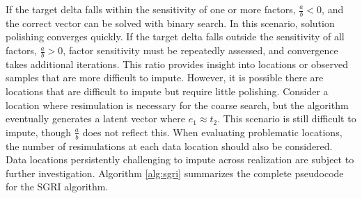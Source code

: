 If the target delta falls within the sensitivity of one or more factors, $\frac{a}{b}<0$, and the correct vector can be solved with binary search. In this scenario, solution polishing converges quickly. If the target delta falls outside the sensitivity of all factors, $\frac{a}{b}>0$, factor sensitivity must be repeatedly assessed, and convergence takes additional iterations. This ratio provides insight into locations or observed samples that are more difficult to impute. However, it is possible there are locations that are difficult to impute but require little polishing. Consider a location where resimulation is necessary for the coarse search, but the algorithm eventually generates a latent vector where $e_{1} \approx t_{2}$. This scenario is still difficult to impute, though $\frac{a}{b}$ does not reflect this. When evaluating problematic locations, the number of resimulations at each data location should also be considered. Data locations persistently challenging to impute across realization are subject to further investigation. Algorithm \ref{alg:sgri} summarizes the complete pseudocode for the \gls{SGRI} algorithm.


